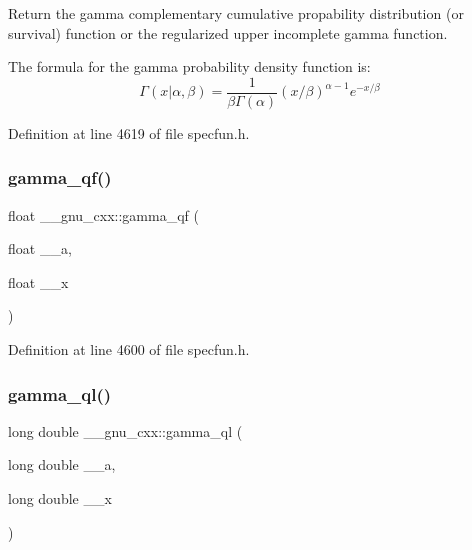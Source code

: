 Return the gamma complementary cumulative propability distribution (or survival) function or the regularized upper incomplete gamma function. 

The formula for the gamma probability density function is\+: \[ \Gamma(x|\alpha,\beta) = \frac{1}{\beta\Gamma(\alpha)} (x/\beta)^{\alpha - 1} e^{-x/\beta} \] 

Definition at line 4619 of file specfun.\+h.

\mbox{\label{group__mathsf__gnu_ga3ee8d2c40b904952538709cbb0e664a4}} 
\subsubsection{\texorpdfstring{gamma\+\_\+qf()}{gamma\_qf()}}
{\footnotesize\ttfamily float \+\_\+\+\_\+gnu\+\_\+cxx\+::gamma\+\_\+qf (\begin{DoxyParamCaption}\item[{float}]{\+\_\+\+\_\+a,  }\item[{float}]{\+\_\+\+\_\+x }\end{DoxyParamCaption})\hspace{0.3cm}{\ttfamily [inline]}}



Definition at line 4600 of file specfun.\+h.

\mbox{\label{group__mathsf__gnu_ga5364a098596681809294d25741539ffc}} 
\subsubsection{\texorpdfstring{gamma\+\_\+ql()}{gamma\_ql()}}
{\footnotesize\ttfamily long double \+\_\+\+\_\+gnu\+\_\+cxx\+::gamma\+\_\+ql (\begin{DoxyParamCaption}\item[{long double}]{\+\_\+\+\_\+a,  }\item[{long double}]{\+\_\+\+\_\+x }\end{DoxyParamCaption})\hspace{0.3cm}{\ttfamily [inline]}}



